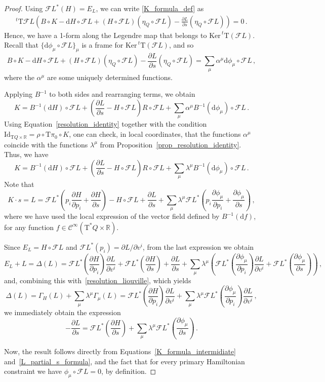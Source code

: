 \documentclass[10pt,a4paper]{amsart}
\def\FL{\mathcal{F} L}
\def\Ker{\mathrm{Ker \,}}
\def\Tan{\mathrm{T}}
\newcommand{\Cinfty}{\mathscr{C}^\infty}
\newcommand{\Id}{\mathrm{Id}}
\newcommand{\R}{\mathbb{R}}
\newcommand{\T}{\mathrm{T}}
\newcommand{\fracp}[2]{\frac{\partial #1}{\partial #2}}
\newcommand{\parder}[2]{\frac{\partial #1}{\partial #2}}
\newcommand{\tparder}[2]{\partial #1/\partial #2}
\renewcommand{\d}{\mathrm{d}}
\begin{document}
\begin{proof}
    Using $\FL^* (H) = E_L$, we can write \eqref{K_formula_def} as
\begin{align}
        ^t \T \FL\left(B\circ K -\d H \circ \FL + (H \circ\FL) (\eta_Q\circ \FL)- \parder{L}{s}(\eta_Q\circ \FL)\right) = 0\,.
\end{align}
Hence, we have a 1-form along the Legendre map that belongs to $\Ker ^t\Tan(\FL)$. Recall that $\{\d \phi_{\mu}\circ \FL\}_\mu$ is a frame for $\Ker ^t\Tan(\FL)$, and so
$$B\circ K -\d H \circ \FL + (H \circ\FL) (\eta_Q\circ \FL)- \parder{L}{s}(\eta_Q\circ \FL)=\sum_{\mu} \alpha^{\mu} \d\phi_{\mu}\circ\FL\,,$$
where the $\alpha^{\mu}$ are some uniquely  determined functions. 

Applying $B^{-1}$ to both sides and rearranging terms, we obtain
$$K= B^{-1}(\d H) \circ \FL + \left( \parder{L}{s}  -H \circ\FL\right)R\circ \FL + \sum_{\mu}\alpha^{\mu} B^{-1}(\d\phi_{\mu})\circ\FL\,.$$
Using Equation~\eqref{resolution_identity} together with the condition 
$\Id_{\Tan Q \times \R} = \rho\circ \Tan\pi_0 \circ K$, one can check, in local coordinates, that the functions $\alpha^{\mu}$ coincide with the functions $\lambda^{\mu}$ from Proposition~\ref{prop_resolution_identity}.
Thus, we have
\begin{equation}\label{K_formula_intermidiate}
    K= B^{-1}(\d H) \circ \FL + \left( \parder{L}{s}  -H \circ\FL\right)R\circ \FL + \sum_{\mu}\lambda^{\mu} B^{-1}(\d\phi_{\mu})\circ\FL\,.
\end{equation}
Note that
\begin{equation}
    K\cdot s =L = \FL^*\left(p_i\parder{H}{p_i}+\parder{H}{s}\right) - H\circ \FL +\parder{L}{s} +\sum_{\mu} \lambda^{\mu} \FL^*\left(p_i\parder{\phi_\mu}{p_i}+\parder{\phi_{\mu}}{s}\right)\,,
\end{equation}
where we have used the local expression of the vector field defined by $\displaystyle B^{-1}(\d f)$, for any function $f\in \Cinfty (\Tan^*Q \times \R)$.

Since $E_L = H\circ \FL$ and $\FL^*(p_i)=\tparder{L}{v^i}$, from the last expression we obtain
\begin{equation}
    E_L+L=\Delta(L) = \FL^*\left(\parder{H}{p_i}\right)\fracp{L}{v^i}+\FL^*\left(\parder{H}{s}\right) +\parder{L}{s} +\sum_{\mu} \lambda^{\mu} \left(\FL^*\left(\parder{\phi_\mu}{p_i}\right)\fracp{L}{v^i}+\FL^*\left(\parder{\phi_{\mu}}{s}\right)\right)\,,
\end{equation}
and, combining this with~\eqref{resolution_liouville}, which yields
\begin{equation}
    \Delta(L) = \Gamma_H(L) +\sum_{\mu}\lambda^{\mu} \Gamma_{\mu}(L) = \FL^*\left(\parder{H}{p_i}\right)\parder{L}{v^i}+\sum_{\mu}\lambda^{\mu}\FL^*\left(\parder{\phi_{\mu}}{p_i}\right)\parder{L}{v^i}\,,
\end{equation}
we immediately obtain the expression
\begin{equation}\label{L_partial_s_formula}
    -\parder{L}{s} = \FL^*\left(\parder{H}{s}\right) + \sum_{\mu}\lambda^{\mu}\FL^*\left( \parder{\phi_{\mu}}{s} \right)\,.
\end{equation}



Now, the result follows directly from Equations~\eqref{K_formula_intermidiate} and~\eqref{L_partial_s_formula}, and the fact that for every primary Hamiltonian constraint we have $\phi_{\mu}\circ \FL = 0$, by definition.
\end{proof}
\end{document}
